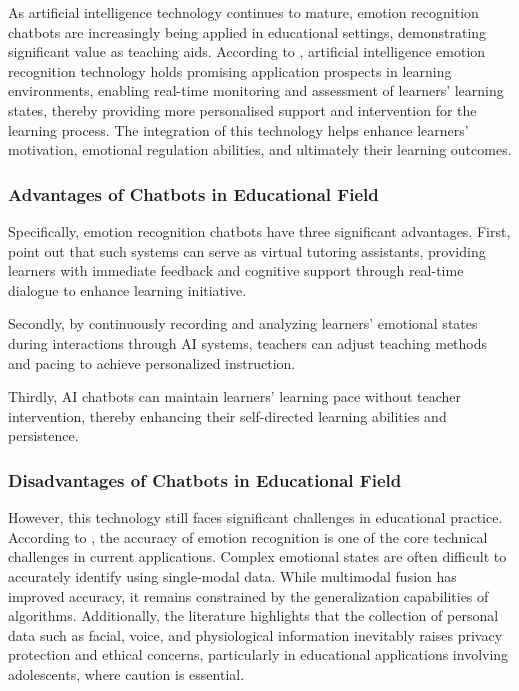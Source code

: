 \documentclass{xum_review}
\begin{document}
As artificial intelligence technology continues to mature, emotion recognition
chatbots are increasingly being applied in educational settings, demonstrating
significant value as teaching aids. According to \citet{arsad2024integrating},
artificial intelligence emotion recognition technology
holds promising application prospects in learning environments, enabling
real-time monitoring and assessment of learners' learning states, thereby
providing more personalised support and intervention for the learning process.
The integration of this technology helps enhance learners' motivation, emotional
regulation abilities, and ultimately their learning outcomes.

\subsubsection{Advantages of Chatbots in Educational Field}

Specifically, emotion recognition chatbots have three significant advantages.
First, \citet{siregar2024ai} point out that such systems can
serve as virtual tutoring assistants, providing learners with immediate feedback
and cognitive support through real-time dialogue to enhance learning initiative. 

Secondly, by continuously recording and analyzing learners' emotional states
during interactions through AI systems, teachers can adjust teaching methods and
pacing to achieve personalized instruction. 

Thirdly, AI chatbots can maintain learners' learning pace without teacher
intervention, thereby enhancing their self-directed learning abilities and
persistence. 

\subsubsection{Disadvantages of Chatbots in Educational Field}

However, this technology still faces significant challenges in educational
practice. According to \citet{arsad2024integrating}, the accuracy of emotion recognition
is one of the core technical challenges in current applications. Complex
emotional states are often difficult to accurately identify using single-modal
data. While multimodal fusion has improved accuracy, it remains constrained by
the generalization capabilities of algorithms. Additionally, the literature
highlights that the collection of personal data such as facial, voice, and
physiological information inevitably raises privacy protection and ethical
concerns, particularly in educational applications involving adolescents, where
caution is essential. 
\end{document}

